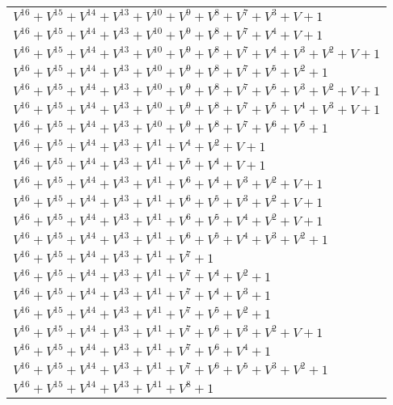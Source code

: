 \documentclass[12pt]{article}
\begin{document}
\begin{adjustwidth}{-4cm}{}
\begin{center}
\begin{longtable}{|l|}
$V^{16}  +V^{15}  +V^{14}  +V^{13}  +V^{10}  +V^{9}  +V^{8}  +V^{7}  +V^{3}  + V + 1$ \\
$V^{16}  +V^{15}  +V^{14}  +V^{13}  +V^{10}  +V^{9}  +V^{8}  +V^{7}  +V^{4}  + V + 1$ \\
$V^{16}  +V^{15}  +V^{14}  +V^{13}  +V^{10}  +V^{9}  +V^{8}  +V^{7}  +V^{4}  +V^{3}  +V^{2}  + V + 1$ \\
$V^{16}  +V^{15}  +V^{14}  +V^{13}  +V^{10}  +V^{9}  +V^{8}  +V^{7}  +V^{5}  +V^{2}  + 1$ \\
$V^{16}  +V^{15}  +V^{14}  +V^{13}  +V^{10}  +V^{9}  +V^{8}  +V^{7}  +V^{5}  +V^{3}  +V^{2}  + V + 1$ \\
$V^{16}  +V^{15}  +V^{14}  +V^{13}  +V^{10}  +V^{9}  +V^{8}  +V^{7}  +V^{5}  +V^{4}  +V^{3}  + V + 1$ \\
$V^{16}  +V^{15}  +V^{14}  +V^{13}  +V^{10}  +V^{9}  +V^{8}  +V^{7}  +V^{6}  +V^{5}  + 1$ \\
$V^{16}  +V^{15}  +V^{14}  +V^{13}  +V^{11}  +V^{4}  +V^{2}  + V + 1$ \\
$V^{16}  +V^{15}  +V^{14}  +V^{13}  +V^{11}  +V^{5}  +V^{4}  + V + 1$ \\
$V^{16}  +V^{15}  +V^{14}  +V^{13}  +V^{11}  +V^{6}  +V^{4}  +V^{3}  +V^{2}  + V + 1$ \\
$V^{16}  +V^{15}  +V^{14}  +V^{13}  +V^{11}  +V^{6}  +V^{5}  +V^{3}  +V^{2}  + V + 1$ \\
$V^{16}  +V^{15}  +V^{14}  +V^{13}  +V^{11}  +V^{6}  +V^{5}  +V^{4}  +V^{2}  + V + 1$ \\
$V^{16}  +V^{15}  +V^{14}  +V^{13}  +V^{11}  +V^{6}  +V^{5}  +V^{4}  +V^{3}  +V^{2}  + 1$ \\
$V^{16}  +V^{15}  +V^{14}  +V^{13}  +V^{11}  +V^{7}  + 1$ \\
$V^{16}  +V^{15}  +V^{14}  +V^{13}  +V^{11}  +V^{7}  +V^{4}  +V^{2}  + 1$ \\
$V^{16}  +V^{15}  +V^{14}  +V^{13}  +V^{11}  +V^{7}  +V^{4}  +V^{3}  + 1$ \\
$V^{16}  +V^{15}  +V^{14}  +V^{13}  +V^{11}  +V^{7}  +V^{5}  +V^{2}  + 1$ \\
$V^{16}  +V^{15}  +V^{14}  +V^{13}  +V^{11}  +V^{7}  +V^{6}  +V^{3}  +V^{2}  + V + 1$ \\
$V^{16}  +V^{15}  +V^{14}  +V^{13}  +V^{11}  +V^{7}  +V^{6}  +V^{4}  + 1$ \\
$V^{16}  +V^{15}  +V^{14}  +V^{13}  +V^{11}  +V^{7}  +V^{6}  +V^{5}  +V^{3}  +V^{2}  + 1$ \\
$V^{16}  +V^{15}  +V^{14}  +V^{13}  +V^{11}  +V^{8}  + 1$ \\

\end{longtable}
\end{center}
\end{adjustwidth}
\end{document}

